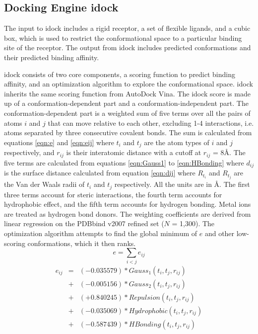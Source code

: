 \documentclass[10pt]{article}
\begin{document}
\subsection*{Docking Engine idock}
The input to idock includes a rigid receptor, a set of flexible ligands, and a cubic box, which is used to restrict the conformational space to a particular binding site of the receptor. The output from idock includes predicted conformations and their predicted binding affinity.

idock consists of two core components, a scoring function to predict binding affinity, and an optimization algorithm to explore the conformational space. idock inherits the same scoring function from AutoDock Vina. The idock score is made up of a conformation-dependent part and a conformation-independent part. The conformation-dependent part is a weighted sum of five terms over all the pairs of atoms $i$ and $j$ that can move relative to each other, excluding 1-4 interactions, i.e. atoms separated by three consecutive covalent bonds. The sum is calculated from equations \eqref{eqn:e} and \eqref{eqn:eij} where $t_i$ and $t_j$ are the atom types of $i$ and $j$ respectively, and $r_{ij}$ is their interatomic distance with a cutoff at $r_{ij}$ = 8\AA. The five terms are calculated from equations \eqref{eqn:Gauss1} to \eqref{eqn:HBonding} where $d_{ij}$ is the surface distance calculated from equation \eqref{eqn:dij} where $R_{t_i}$ and $R_{t_j}$ are the Van der Waals radii of $t_i$ and $t_j$ respectively. All the units are in \AA. The first three terms account for steric interactions, the fourth term accounts for hydrophobic effect, and the fifth term accounts for hydrogen bonding. Metal ions are treated as hydrogen bond donors. The weighting coefficients are derived from linear regression on the PDBbind \cite{529,530} v2007 refined set ($N$ = 1,300). The optimization algorithm attempts to find the global minimum of $e$ and other low-scoring conformations, which it then ranks.
\begin{equation}
\label{eqn:e}
e = \sum_{i < j} e_{ij}
\end{equation}
\begin{eqnarray}
\label{eqn:eij}
e_{ij} &=& (-0.035579) * Gauss_1(t_i, t_j, r_{ij}) \nonumber \\
       &+& (-0.005156) * Gauss_2(t_i, t_j, r_{ij}) \nonumber \\
       &+& (+0.840245) * Repulsion(t_i, t_j, r_{ij}) \nonumber \\
       &+& (-0.035069) * Hydrophobic(t_i, t_j, r_{ij}) \nonumber \\
       &+& (-0.587439) * HBonding(t_i, t_j, r_{ij})
\end{eqnarray}
\end{document}
